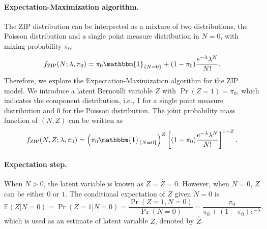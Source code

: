 \documentclass[11pt]{article}
\numberwithin{equation}{section}
\def\E{{\mathbb E}}  %
\begin{document}
\paragraph{Expectation-Maximization algorithm.}

The ZIP distribution can be interpreted as a mixture of two distributions, the Poisson distribution and a single point measure distribution in $N=0$, with mixing probability $\pi_0$:
$$f_\text{ZIP}(N;\lambda,\pi_0)= \pi_0\mathbbm{1}_{\{N=0\}} + 
(1-\pi_0)\frac{e^{-\lambda}\lambda^N}{N!}.$$
Therefore, we explore the Expectation-Maximization algorithm for the ZIP model.
We introduce a latent Bernoulli variable $Z$ with $\Pr(Z=1)=\pi_0$, which indicates the component distribution, i.e., 1 for a single point measure distribution and 0 for the Poisson distribution.
The joint probability mass function of $(N,Z)$ can be written as 
\begin{equation}
	f_\text{ZIP}(N,Z;\lambda,\pi_0)= \left(\pi_0\mathbbm{1}_{\{N=0\}}\right)^{Z}
	\left[(1-\pi_0)\frac{e^{-\lambda}\lambda^N}{N!}\right]^{1-Z}.
\end{equation}


\paragraph{Expectation step.}
When $N>0$, the latent variable is known as $Z=\hat{Z}=0$. However, when $N=0$, $Z$ can be either $0$ or $1$. The conditional expectation of $Z$ given $N=0$ is 
$$\E(Z|N=0)=\Pr(Z=1|N=0)=\frac{\Pr(Z=1,N=0)}{\Pr(N=0)}=\frac{\pi_0}{\pi_0+(1-\pi_0)e^{-\lambda}},$$
which is used as an estimate of latent variable $Z$, denoted by $\hat{Z}$. 
\end{document}
